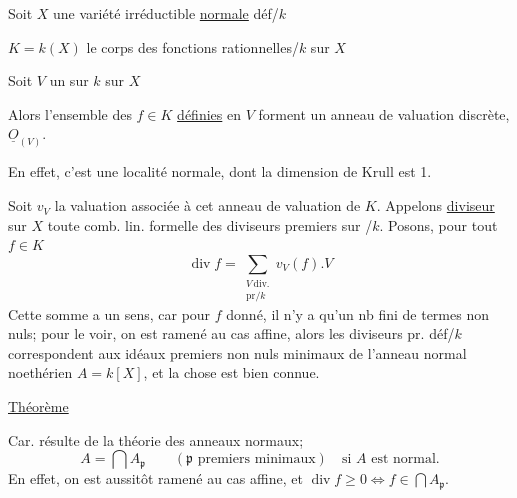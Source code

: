 Soit $X$ une variété irréductible \uline{normale} déf/$k$

$K=k(X)$ le corps des fonctions rationnelles/$k$ sur $X$

Soit $V$ un   sur $k$ sur $X$

Alors l'ensemble des $f\in K$ \uline{définies} en $V$ forment un anneau de valuation discrète,  $\underline O_{(V)}$.

En effet, c'est une  localité normale, dont la dimension de Krull est 1.

Soit $v_V$ la valuation  associée à cet anneau de valuation de $K$. Appelons \uline{diviseur}  sur $X$ toute comb. lin. formelle des diviseurs premiers sur /$k$. Posons, pour tout $f\in K$
\[
\operatorname{div}f=\sum_{\substack{V\,\mathrm{div.}\\\mathrm{pr}/k}}v_V(f).V
\]
Cette somme a un sens, car pour $f$ donné, il n'y a qu'un nb fini de termes non nuls;  pour le voir, on est ramené au cas  affine, alors les diviseurs pr. déf/$k$ correspondent aux idéaux premiers non nuls minimaux de l'anneau normal noethérien $A=k[X]$, et la chose est bien connue.

\uline{Théorème}  

Car. résulte de la théorie des anneaux normaux;
\[
A=\bigcap A_{\mathfrak p}\qquad(\mathfrak p\text{ premiers minimaux})\quad\text{si }A\text{ est normal.}
\]
En effet, on est aussitôt ramené au cas affine, et $\operatorname{div}f\geq0\Longleftrightarrow f\in\bigcap A_{\mathfrak p}$.

